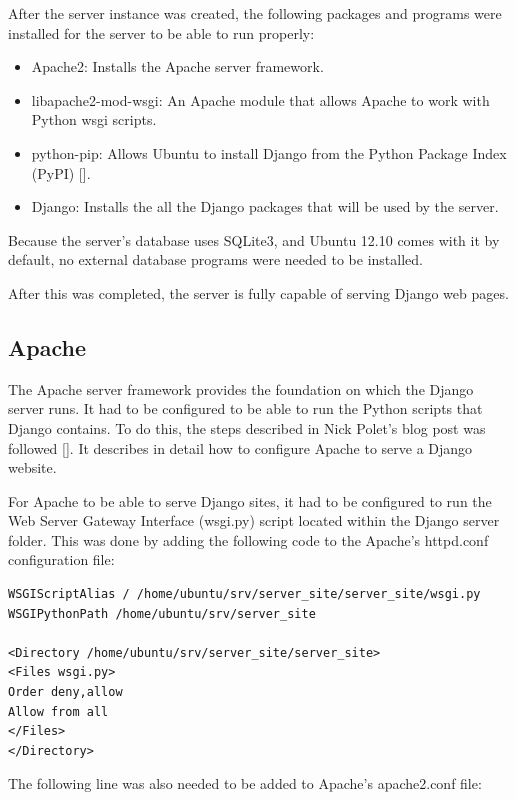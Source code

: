 After the server instance was created, the following packages and programs were installed for
the server to be able to run properly:

\begin{itemize}
  \item Apache2: Installs the Apache server framework.
  \item libapache2-mod-wsgi: An Apache module that allows Apache to work with Python wsgi
  scripts.
  \item python-pip: Allows Ubuntu to install Django from the Python Package Index (PyPI)
  [\cite{website:pypi}].
  \item Django: Installs the all the Django packages that will be used by the server. 
\end{itemize}

Because the server's database uses SQLite3, and Ubuntu 12.10 comes with it by default, no
external database programs were needed to be installed. 

After this was completed, the server is fully capable of serving Django web
pages.

\subsection{Apache}

The Apache server framework provides the foundation on which the Django server runs. It had to
be configured to be able to run the Python scripts that Django contains. To do this, the steps
described in Nick Polet's blog post was followed [\cite{article:apache-setup}]. It describes
in detail how to configure Apache to serve a Django website.

For Apache to be able to serve Django sites, it had to be configured to run the Web Server
Gateway Interface (wsgi.py) script located within the Django server folder. This was done by
adding the following code to the Apache's httpd.conf configuration file:

\begin{verbatim}
WSGIScriptAlias / /home/ubuntu/srv/server_site/server_site/wsgi.py
WSGIPythonPath /home/ubuntu/srv/server_site

<Directory /home/ubuntu/srv/server_site/server_site>
<Files wsgi.py>
Order deny,allow
Allow from all
</Files>
</Directory>
\end{verbatim}

The following line was also needed to be added to Apache's apache2.conf file:

